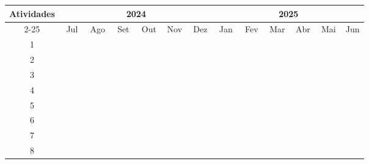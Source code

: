 \begin{center}


{\small \noindent
\begin{tabular}{|c|c|c|c|c|c|c|c|c|c|c|c|c|c|c|c|c|c|c|c|c|c|c|c|c|}
\hline
\multicolumn{1}{|c|}{\multirow{2}{*}{Atividades}} & \multicolumn{12}{c|}{2024} & \multicolumn{12}{c|}{2025} \\ \cline{2-25}
& \multicolumn{2}{c|}{Jul} & \multicolumn{2}{c|}{Ago} & \multicolumn{2}{c|}{Set} & \multicolumn{2}{c|}{Out} & \multicolumn{2}{c|}{Nov} & \multicolumn{2}{c|}{Dez} & \multicolumn{2}{c|}{Jan} & \multicolumn{2}{c|}{Fev} & \multicolumn{2}{c|}{Mar} & \multicolumn{2}{c|}{Abr} & \multicolumn{2}{c|}{Mai} & \multicolumn{2}{c|}{Jun} \\ \hline
1 & ~ & ~ & \cellcolor{black} & ~ & ~ & ~ & ~ & ~ & ~ & ~ & ~ & ~ & ~ & ~ & ~ & ~ & ~ & ~ & ~ & ~ & ~ & ~ & ~ & \\ \hline
2 & ~ & ~ & ~ & \cellcolor{black} & ~ & ~ & ~ & ~ & ~ & ~ & ~ & ~ & ~ & ~ & ~ & ~ & ~ & ~ & ~ & ~ & ~ & ~ & ~ & \\ \hline
3 & ~ & ~ & ~ & ~ & \cellcolor{black} & ~ & ~ & ~ & ~ & ~ & ~ & ~ & ~ & ~ & ~ & ~ & ~ & ~ & ~ & ~ & ~ & ~ & ~ & \\ \hline
4 & ~ & ~ & ~ & ~ & ~ & \cellcolor{black} & \cellcolor{black} & \cellcolor{black} & \cellcolor{black} & ~ & ~ & ~ & ~ & ~ & ~ & ~ & ~ & ~ & ~ & ~ & ~ & ~ & ~ & \\ \hline
5 & ~ & ~ & ~ & ~ & ~ & ~ & ~ & ~ & ~ & \cellcolor{black} & \cellcolor{black} & \cellcolor{black} & \cellcolor{black} & ~ & ~ & ~ & ~ & ~ & ~ & ~ & ~ & ~ & ~ & \\ \hline
6 & ~ & ~ & ~ & ~ & ~ & ~ & ~ & ~ & ~ & ~ & ~ & ~ & ~ & \cellcolor{black} & \cellcolor{black} & \cellcolor{black} & \cellcolor{black} & ~ & ~ & ~ & ~ & ~ & ~ & \\ \hline
7 & ~ & ~ & ~ & ~ & ~ & ~ & ~ & ~ & ~ & ~ & ~ & ~ & ~ & ~ & ~ & ~ & ~ & \cellcolor{black} & \cellcolor{black} & \cellcolor{black} & \cellcolor{black} & \cellcolor{black} & ~ & \\ \hline
8 & ~ & ~ & \cellcolor{black} & \cellcolor{black} & \cellcolor{black} & \cellcolor{black} & \cellcolor{black} & \cellcolor{black} & \cellcolor{black} & \cellcolor{black} & \cellcolor{black} & \cellcolor{black} & \cellcolor{black} & \cellcolor{black} & \cellcolor{black} & \cellcolor{black} & \cellcolor{black} & \cellcolor{black} & \cellcolor{black} & \cellcolor{black} & \cellcolor{black} & \cellcolor{black} & ~ & \\ \hline
\end{tabular}
}

\end{center}
